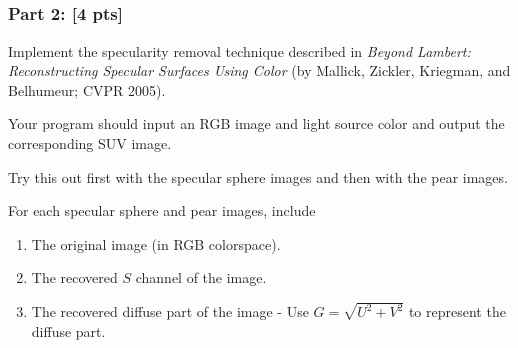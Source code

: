 \documentclass[11pt]{article}
\begin{document}
    \begin{center}
    \end{center}
    { \hspace*{\fill} \\}
    
    \begin{center}
    \end{center}
    { \hspace*{\fill} \\}
    
    \begin{center}
    \end{center}
    { \hspace*{\fill} \\}
    
    \begin{center}
    \end{center}
    { \hspace*{\fill} \\}
    
    \hypertarget{part-2-4-pts}{%
\subsubsection{Part 2: {[}4 pts{]}}\label{part-2-4-pts}}

Implement the specularity removal technique described in \emph{Beyond
Lambert: Reconstructing Specular Surfaces Using Color} (by Mallick,
Zickler, Kriegman, and Belhumeur; CVPR 2005).

Your program should input an RGB image and light source color and output
the corresponding SUV image.

Try this out first with the specular sphere images and then with the
pear images.

For each specular sphere and pear images, include

\begin{enumerate}
\def\labelenumi{\arabic{enumi}.}
\item
  The original image (in RGB colorspace).
\item
  The recovered \(S\) channel of the image.
\item
  The recovered diffuse part of the image - Use \(G = \sqrt{U^2+V^2}\)
  to represent the diffuse part.
\end{enumerate}
\end{document}
